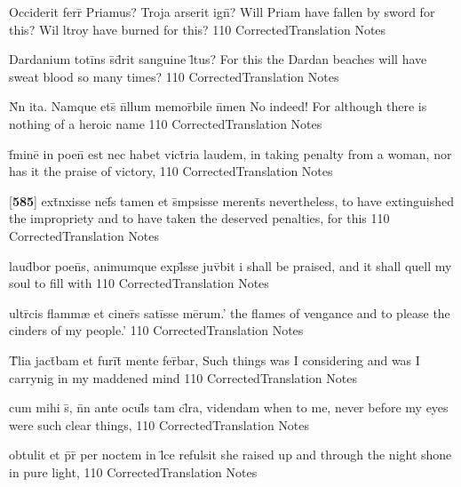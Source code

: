 \latline
  {Occiderit ferr\={} Priamus?  Troja arserit ign\={\macron {\i}}?}
  { Will Priam have fallen by sword for this?  Wil ltroy have burned for this? }
  {110}
  { CorrectedTranslation }
  { Notes }


\latline
  {Dardanium toti\={}ns s\={}d\={}rit sanguine l\={\macron {\i}}tus?}
  { For this the Dardan beaches will have sweat blood so many times? }
  {110}
  { CorrectedTranslation }
  { Notes }


\latline
  {N\={}n ita.  Namque ets\={\macron {\i}} n\={}llum memor\={}bile n\={}men}
  { No indeed!  For although there is nothing of a heroic name }
  {110}
  { CorrectedTranslation }
  { Notes }


\latline
  {f\={}mine\={} in poen\={} est nec habet vict\={}ria laudem,}
  { in taking penalty from a woman, nor has it the praise of victory, }
  {110}
  { CorrectedTranslation }
  { Notes }


\latline
  {[\textbf{585}] ext\={\macron {\i}}nxisse nef\={}s tamen et s\={}mpsisse merent\={\macron {\i}}s}
  { nevertheless, to have extinguished the impropriety and to have taken the deserved penalties, for this }
  {110}
  { CorrectedTranslation }
  { Notes }


\latline
  {laud\={}bor poen\={}s, animumque expl\={}sse juv\={}bit}
  { i shall be praised, and it shall quell my soul to fill with  }
  {110}
  { CorrectedTranslation }
  { Notes }


\latline
  {ultr\={\macron {\i}}cis flamm{\ae} et ciner\={}s sati\={}sse me\={}rum.'}
  { the flames of vengance and to please the cinders of my people.' }
  {110}
  { CorrectedTranslation }
  { Notes }

\latline
  {T\={}lia jact\={}bam et furi\={}t\={} mente fer\={}bar,}
  { Such things was I considering and was I carrynig in my maddened mind }
  {110}
  { CorrectedTranslation }
  { Notes }


\latline
  {cum mihi s\={}, n\={}n ante ocul\={\macron {\i}}s tam cl\={}ra, videndam}
  { when to me, never before my eyes were such clear things, }
  {110}
  { CorrectedTranslation }
  { Notes }


\latline
  {obtulit et p\={}r\={} per noctem in l\={}ce refulsit}
  { she raised up and through the night shone in pure light, }
  {110}
  { CorrectedTranslation }
  { Notes }


